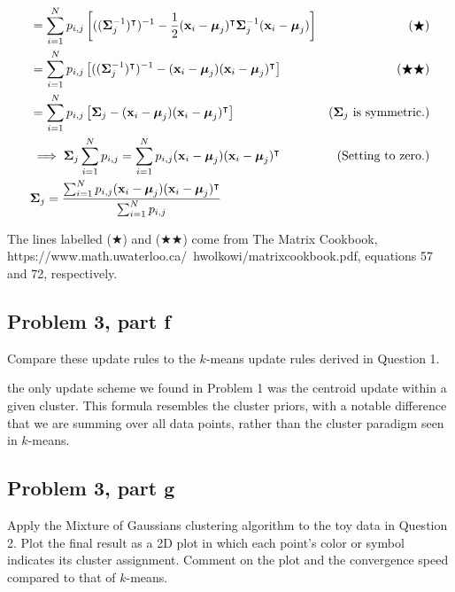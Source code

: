 \begin{solution}
\begin{align*}
        &= \sum_{i = 1}^N p_{i, j} \left[ ((\boldsymbol{\Sigma}^{-1}_j)^{\intercal})^{-1} - \frac{1}{2}(\textbf{x}_i - \boldsymbol{\mu}_j)^{\intercal} \boldsymbol{\Sigma}^{-1}_j (\textbf{x}_i - \boldsymbol{\mu}_j)\right] &(\bigstar)\\
        &= \sum_{i = 1}^N p_{i, j} \left[ ((\boldsymbol{\Sigma}^{-1}_j)^{\intercal})^{-1} - (\textbf{x}_i - \boldsymbol{\mu}_j) (\textbf{x}_i - \boldsymbol{\mu}_j)^{\intercal} \right] &(\bigstar \bigstar)\\
        &= \sum_{i = 1}^N p_{i, j} \left[ \boldsymbol{\Sigma}_j - (\textbf{x}_i - \boldsymbol{\mu}_j) (\textbf{x}_i - \boldsymbol{\mu}_j)^{\intercal} \right] &\text{($\boldsymbol{\Sigma}_j$ is symmetric.)}\\
        &\implies \boldsymbol{\Sigma}_j \sum_{i = 1}^N p_{i, j} = \sum_{i = 1}^N p_{i, j}(\textbf{x}_i - \boldsymbol{\mu}_j)(\textbf{x}_i - \boldsymbol{\mu}_j)^{\intercal}  &\text{(Setting to zero.)}\\
        &\boldsymbol{\Sigma}_j = \frac{\sum_{i = 1}^N p_{i, j}(\textbf{x}_i - \boldsymbol{\mu}_j)(\textbf{x}_i - \boldsymbol{\mu}_j)^{\intercal}}{\sum_{i = 1}^N p_{i, j}}
    \end{align*}
    \vspace{-12mm} \alignbreak

    The lines labelled ($\bigstar$) and ($\bigstar \bigstar$) come from The Matrix Cookbook, https://www.math.uwaterloo.ca/~hwolkowi/matrixcookbook.pdf, equations 57 and 72, respectively.  
\end{solution}

\newpage
\subsection{Problem 3, part f}
Compare these update rules to the $k$-means update rules derived in Question 1. 
\partbreak
\begin{solution}

    the only update scheme we found in Problem 1 was the centroid update within a given cluster. This formula resembles the cluster priors, with a notable difference that we are summing over all data points, rather than the cluster paradigm seen in $k$-means.   
\end{solution}

\newpage
\subsection{Problem 3, part g}
Apply the Mixture of Gaussians clustering algorithm to the toy data in Question 2. Plot the final result as a 2D plot in which each point's color or symbol indicates its cluster assignment. Comment on the plot and the convergence speed compared to that of $k$-means. 

